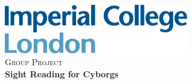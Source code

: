 \begin{titlepage}
    \begin{center}
        \includegraphics[width=0.60\textwidth]{./imperial.eps}~\\[1cm]
        \textsc{\LARGE Group Project}
        \HRule \\[0.4cm]
        {\huge \bfseries Sight Reading for Cyborgs \\[0.4cm]}
        \HRule \\[1.5cm]
    \end{center}
\end{titlepage}
